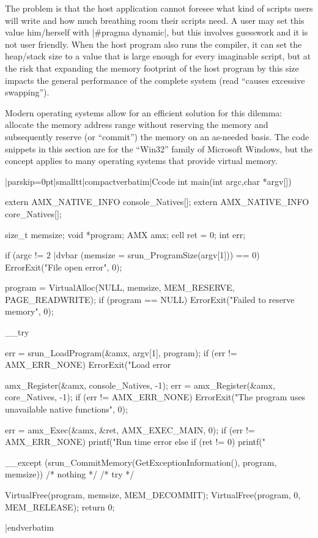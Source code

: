 \noindent{}%
The problem is that the host application cannot foresee what kind of scripts
users will write and how much breathing room their scripts need. A user may set
this value him/herself with |#pragma dynamic|, but this involves guesswork and
it is not user friendly. When the host program also runs the compiler, it can
set the heap\slash stack size to a value that is large enough for every
imaginable script, but at the risk that expanding the memory footprint of the
host program by this size impacts the general performance of the complete system
(read ``causes excessive swapping'').

Modern operating systems allow for an efficient solution for this dilemma:
allocate the memory address range without reserving the memory and
subsequently reserve (or ``commit'') the memory on an as-needed basis. The
code snippets in this section are for the ``Win32'' family of Microsoft
Windows, but the concept applies to many operating systems that provide
virtual memory.

\listingx\verbatim|parskip=0pt|smalltt|compactverbatim|Ccode
int main(int argc,char *argv[])
{
  extern AMX_NATIVE_INFO console_Natives[];
  extern AMX_NATIVE_INFO core_Natives[];

  size_t memsize;
  void *program;
  AMX amx;
  cell ret = 0;
  int err;

  if (argc != 2 |dvbar (memsize = srun_ProgramSize(argv[1])) == 0)
    ErrorExit("File open error", 0);

  program = VirtualAlloc(NULL, memsize, MEM_RESERVE, PAGE_READWRITE);
  if (program == NULL)
    ErrorExit("Failed to reserve memory", 0);

  __try {

    err = srun_LoadProgram(&amx, argv[1], program);
    if (err != AMX_ERR_NONE)
      ErrorExit("Load error %

    amx_Register(&amx, console_Natives, -1);
    err = amx_Register(&amx, core_Natives, -1);
    if (err != AMX_ERR_NONE)
      ErrorExit("The program uses unavailable native functions", 0);

    err = amx_Exec(&amx, &ret, AMX_EXEC_MAIN, 0);
    if (err != AMX_ERR_NONE)
      printf("Run time error %
    else if (ret != 0)
      printf("%

  } __except (srun_CommitMemory(GetExceptionInformation(), program, memsize)){
    /* nothing */
  } /* try */

  VirtualFree(program, memsize, MEM_DECOMMIT);
  VirtualFree(program, 0, MEM_RELEASE);
  return 0;
}
|endverbatim\endlistingx

